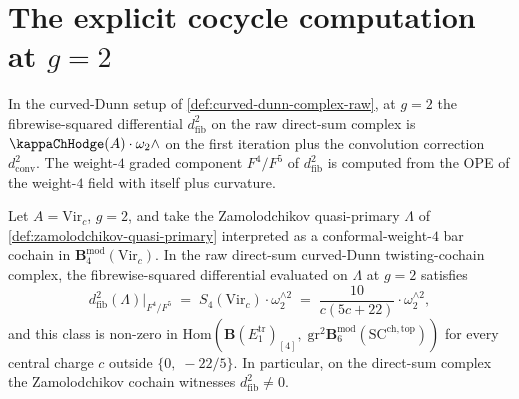 \section{The explicit cocycle computation at \(g = 2\)}
\label{sec:explicit-cocycle-computation}

In the curved-Dunn setup of
\autoref{def:curved-dunn-complex-raw}, at \(g = 2\) the
fibrewise-squared differential \(d^{2}_{\mathrm{fib}}\) on the
raw direct-sum complex is \(\kappaChHodge(A) \cdot \omega_{2} \wedge\)
on the first iteration plus the convolution correction
\(d_{\mathrm{conv}}^{2}\). The weight-\(4\) graded component
\(F^{4}/F^{5}\) of \(d^{2}_{\mathrm{fib}}\) is computed from the
OPE of the weight-\(4\) field with itself plus curvature.

\begin{proposition}
\label{prop:zamolodchikov-cocycle-direct-sum-witness}
\ClaimStatusProvedHere
Let \(A = \mathrm{Vir}_{c}\), \(g = 2\), and take the Zamolodchikov
quasi-primary \(\Lambda\) of
\autoref{def:zamolodchikov-quasi-primary} interpreted as a
conformal-weight-\(4\) bar cochain in
\(\mathbf{B}^{\mathrm{mod}}_{4}(\mathrm{Vir}_{c})\). In the raw
direct-sum curved-Dunn twisting-cochain complex, the
fibrewise-squared differential evaluated on \(\Lambda\) at
\(g = 2\) satisfies
\[
 d^{2}_{\mathrm{fib}}(\Lambda)\Big|_{F^{4}/F^{5}}
 \;=\;
 S_{4}(\mathrm{Vir}_{c}) \cdot \omega_{2}^{\wedge 2}
 \;=\;
 \frac{10}{c(5c + 22)} \cdot \omega_{2}^{\wedge 2},
\]
and this class is non-zero in
\(\mathrm{Hom}(\mathbf{B}(E_{1}^{\mathrm{tr}})_{[4]},\;
\mathrm{gr}^{2}\mathbf{B}^{\mathrm{mod}}_{6}(\mathrm{SC}^{\mathrm{ch,top}}))\)
for every central charge \(c\) outside
\(\{0,\; -22/5\}\). In particular, on the direct-sum complex
the Zamolodchikov cochain witnesses
\(d^{2}_{\mathrm{fib}} \ne 0\).
\end{proposition}

